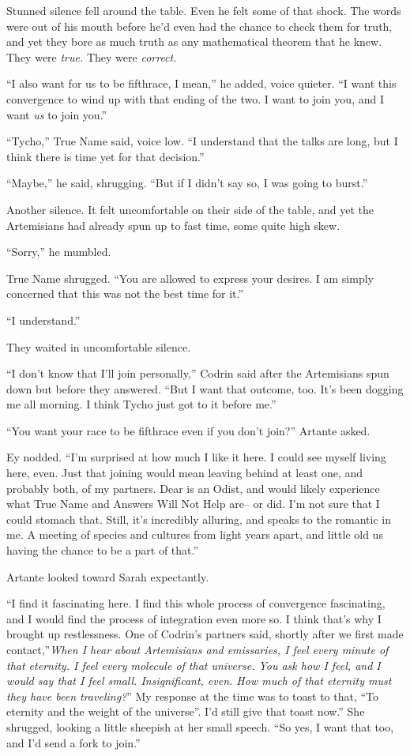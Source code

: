 Stunned silence fell around the table. Even he felt some of that shock. The words were out of his mouth before he'd even had the chance to check them for truth, and yet they bore as much truth as any mathematical theorem that he knew. They were \emph{true.} They were \emph{correct.}

``I also want for us to be fifthrace, I mean,'' he added, voice quieter. ``I want this convergence to wind up with that ending of the two. I want to join you, and I want \emph{us} to join you.''

``Tycho,'' True Name said, voice low. ``I understand that the talks are long, but I think there is time yet for that decision.''

``Maybe,'' he said, shrugging. ``But if I didn't say so, I was going to burst.''

Another silence. It felt uncomfortable on their side of the table, and yet the Artemisians had already spun up to fast time, some quite high skew.

``Sorry,'' he mumbled.

True Name shrugged. ``You are allowed to express your desires. I am simply concerned that this was not the best time for it.''

``I understand.''

They waited in uncomfortable silence.

``I don't know that I'll join personally,'' Codrin said after the Artemisians spun down but before they answered. ``But I want that outcome, too. It's been dogging me all morning. I think Tycho just got to it before me.''

``You want your race to be fifthrace even if you don't join?'' Artante asked.

Ey nodded. ``I'm surprised at how much I like it here. I could see myself living here, even. Just that joining would mean leaving behind at least one, and probably both, of my partners. Dear is an Odist, and would likely experience what True Name and Answers Will Not Help are-- or did. I'm not sure that I could stomach that. Still, it's incredibly alluring, and speaks to the romantic in me. A meeting of species and cultures from light years apart, and little old us having the chance to be a part of that.''

Artante looked toward Sarah expectantly.

``I find it fascinating here. I find this whole process of convergence fascinating, and I would find the process of integration even more so. I think that's why I brought up restlessness. One of Codrin's partners said, shortly after we first made contact,''\emph{When I hear about Artemisians and emissaries, I feel every minute of that eternity. I feel every molecule of that universe. You ask how I feel, and I would say that I feel small. Insignificant, even. How much of that eternity must they have been traveling?}'' My response at the time was to toast to that, ``To eternity and the weight of the universe''. I'd still give that toast now.'' She shrugged, looking a little sheepish at her small speech. ``So yes, I want that too, and I'd send a fork to join.''

